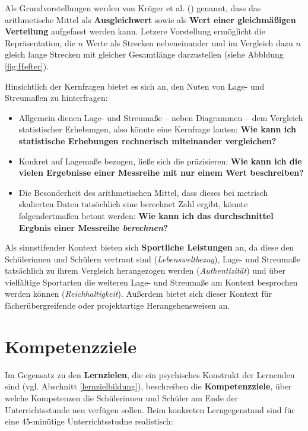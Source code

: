 \documentclass[
]{scrbook}
\providecommand{\tightlist}{%
  \setlength{\itemsep}{0pt}\setlength{\parskip}{0pt}}
\theoremstyle{definition}
\theoremstyle{definition}
\theoremstyle{definition}
\theoremstyle{definition}
\theoremstyle{remark}
\begin{document}
Als \textcolor{semanticColor}{Grundvorstellungen} werden von Krüger et al. () genannt, dass das arithmetische Mittel als \textbf{Ausgleichwert} sowie als \textbf{Wert einer gleichmäßigen Verteilung} aufgefasst werden kann. Letzere Vorstellung ermöglicht die Repräsentation, die \(n\) Werte als Strecken nebeneinander und im Vergleich dazu \(n\) gleich lange Strecken mit gleicher Gesamtlänge darzustellen (siehe Abbldung \ref{fig:Hefter}).

Hinsichtlich der \textcolor{concreteColor}{Kernfragen} bietet es sich an, den Nuten von Lage- und Streumaßen zu hinterfragen:

\begin{itemize}
\tightlist
\item
  Allgemein dienen Lage- und Streumaße -- neben Diagrammen -- dem Vergleich statistischer Erhebungen, also könnte eine Kernfrage lauten: \textbf{Wie kann ich statistische Erhebungen rechnerisch miteinander vergleichen?}
\item
  Konkret auf Lagemaße bezogen, ließe sich die präzisieren: \textbf{Wie kann ich die vielen Ergebnisse einer Messreihe mit nur einem Wert beschreiben?}
\item
  Die Besonderheit des arithmetischen Mittel, dass dieses bei metrisch skalierten Daten tatsöchlich eine berechnet Zahl ergibt, könnte folgendertmaßen betont werden: \textbf{Wie kann ich das durchschnittel Ergbnis einer Messreihe \emph{berechnen}?}
\end{itemize}

Als sinnstifender Kontext bieten sich \textbf{Sportliche Leistungen} an, da diese den Schülerinnen und Schülern vertraut sind (\emph{Lebensweltbezug}), Lage- und Streumaße tatsächlich zu ihrem Vergleich herangezogen werden (\emph{Authentizität}) und über vielfältige Sportarten die weiteren Lage- und Streumaße am Kontext besprochen werden können (\emph{Reichhaltigkeit}). Außerdem bietet sich dieser Kontext für fächerübergreifende oder projektartige Herangehensweisen an.

\section{Kompetenzziele}\label{kompetenzziele}

Im Gegensatz zu den \textbf{Lernzielen}, die ein psychisches Konstrukt der Lernenden sind (vgl. Abschnitt \ref{lernzielbildung}), beschreiben die \textbf{Kompetenzziele}, über welche Kompetenzen die Schülerinnen und Schüler am Ende der Unterrichtsstunde neu verfügen sollen. Beim konkreten Lerngegenstand sind für eine 45-minütige Unterrichtsstudne realistisch:
\end{document}
